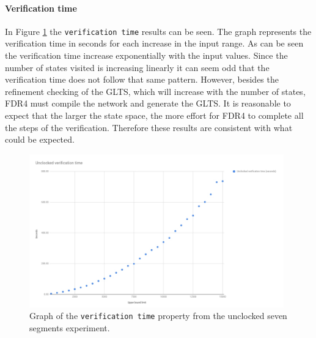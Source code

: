 \paragraph{Verification time}
In Figure \ref{fig:unclocked_verification} the \texttt{verification time} results can be seen. The graph represents the verification time in seconds for each increase in the input range. As can be seen the verification time increase exponentially with the input values. Since the number of states visited is increasing linearly it can seem odd that the verification time does not follow that same pattern. However, besides the refinement checking of the GLTS, which will increase with the number of states, FDR4 must compile the network and generate the GLTS. It is reasonable to expect that the larger the state space, the more effort for FDR4 to complete all the steps of the verification. Therefore these results are consistent with what could be expected.
\begin{figure}
    \includegraphics[width=0.98\textwidth]{./figures/temporary_figures/unclocked_verification_time.jpg}
\caption{Graph of the \texttt{verification time} property from the unclocked seven segments experiment.}
\label{fig:unclocked_verification}
\end{figure}
